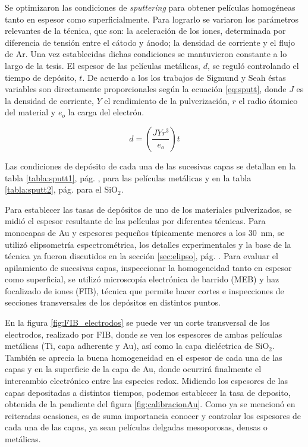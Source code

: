 {		 Se optimizaron las condiciones de \textit{sputtering} para obtener películas homogéneas tanto en espesor como superficialmente. Para lograrlo se variaron los parámetros relevantes de la técnica, que son: la aceleración de los iones, determinada por diferencia de tensión entre el cátodo y ánodo; la densidad de corriente y el flujo de Ar. Una vez establecidas dichas condiciones se mantuvieron constante a lo largo de la tesis. El espesor de las películas metálicas, $d$, se reguló controlando el tiempo de depósito, $t$. De acuerdo a los los trabajos de Sigmund\cite{sigmund1968} y Seah\cite{Seah2005} éstas variables son directamente proporcionales según la ecuación \ref{eq:sputt}, donde $J$ es la densidad de corriente, $Y$ el rendimiento de la pulverización, $r$ el radio átomico del material y $e_o$ la carga del electrón.

	 			\begin{equation}
	 				d=\left(\frac{JYr^3}{e_o}\right)t
	 				\label{eq:sputt}
	 			\end{equation}

		 Las condiciones de depósito de cada una de las sucesivas capas se detallan en la tabla \ref{tabla:sputt1}, pág. \pageref{tabla:sputt1}, para las películas metálicas y en la tabla  \ref{tabla:sputt2}, pág. \pageref{tabla:sputt2} para el SiO$_2$. 


		 Para establecer las tasas de depósitos de uno de los materiales pulverizados, se midió el espesor resultante de las películas por diferentes técnicas. Para monocapas de Au y espesores pequeños típicamente menores a los \SI{30}{\nm}, se utilizó elipsometría espectrométrica, los detalles experimentales y la base de la técnica ya fueron discutidos en la sección \ref{sec:elipso}, pág. \pageref{sec:elipso}. Para evaluar el apilamiento de sucesivas capas, inspeccionar la homogeneidad tanto en espesor como superficial, se utilizó microscopía electrónica de barrido (MEB) y haz focalizado de iones (FIB), técnica que permite hacer cortes e inspecciones de secciones transversales de los depósitos en distintos puntos. 
		
		 En la figura \ref{fig:FIB_electrodos} se puede ver un corte transversal de los electrodos, realizado por FIB, donde se ven los espesores de ambas películas metálicas (Ti, capa adherente y Au), así como la capa dieléctrica de SiO$_2$. También se aprecia la buena homogeneidad en el espesor de cada una de las capas y en la superficie de la capa de Au, donde ocurrirá finalmente el intercambio electrónico entre las especies redox. Midiendo los espesores de las capas depositadas a distintos tiempos, podemos establecer la tasa de deposito, obtenida de la pendiente del figura \ref{fig:calibracionAu}. Como ya se mencionó en reiteradas ocasiones, es de suma importancia conocer y controlar los espesores de cada una de las capas, ya sean películas delgadas mesoporosas, densas o metálicas.


}
